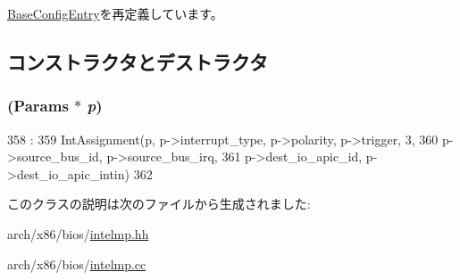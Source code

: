 \hyperlink{classX86ISA_1_1IntelMP_1_1BaseConfigEntry_a94814126eb2e681fbf4837ed24d18616}{BaseConfigEntry}を再定義しています。

\subsection{コンストラクタとデストラクタ}
\hypertarget{classX86ISA_1_1IntelMP_1_1IOIntAssignment_afc9ea941f070e7f180f6c09872d4a1ab}{
\subsubsection[{IOIntAssignment}]{ ({\bf Params} $\ast$ {\em p})}}
\label{classX86ISA_1_1IntelMP_1_1IOIntAssignment_afc9ea941f070e7f180f6c09872d4a1ab}



\begin{DoxyCode}
358                                                         :
359     IntAssignment(p, p->interrupt_type, p->polarity, p->trigger, 3,
360             p->source_bus_id, p->source_bus_irq,
361             p->dest_io_apic_id, p->dest_io_apic_intin)
362 {}

\end{DoxyCode}


このクラスの説明は次のファイルから生成されました:\begin{DoxyCompactItemize}
\item 
arch/x86/bios/\hyperlink{intelmp_8hh}{intelmp.hh}\item 
arch/x86/bios/\hyperlink{intelmp_8cc}{intelmp.cc}\end{DoxyCompactItemize}

